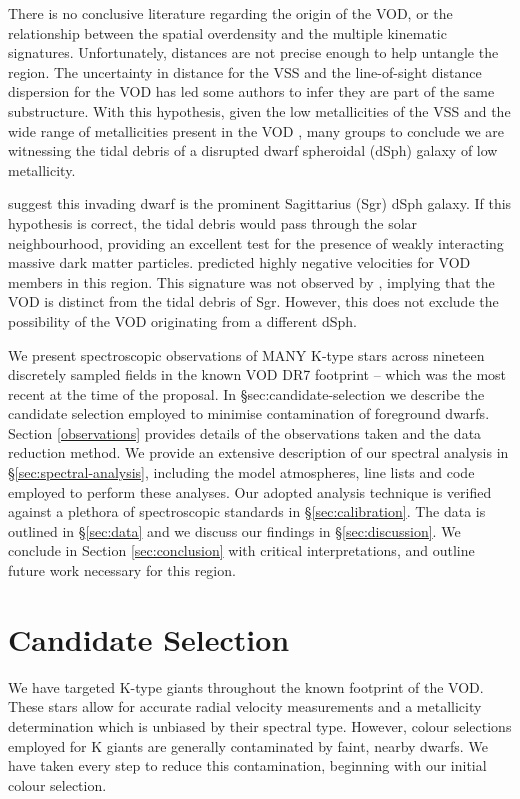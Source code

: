 \documentclass{emulateapj}
\begin{document}
There is no conclusive literature regarding the origin of the VOD, or the relationship between the spatial overdensity and the multiple kinematic signatures. Unfortunately, distances are not precise enough to help untangle the region. The uncertainty in distance for the VSS and the line-of-sight distance dispersion for the VOD has led some authors to infer they are part of the same substructure\citet{Duffau;et-al_2006, Newberg;et-al_2007, Prior;et-al_2009a}. With this hypothesis, given the low metallicities of the VSS \citep{Duffau;et-al_2006, Prior;et-al_2009a} and the wide range of metallicities present in the VOD \citep{Juric;et-al_2008}, many groups \citep{Duffau;et-al_2006, Martinez-Delgado;et-al_2007, Juric;et-al_2008} to conclude we are witnessing the tidal debris of a disrupted dwarf spheroidal (dSph) galaxy of low metallicity.


\citet{Martinez-Delgado;et-al_2007} suggest this invading dwarf is the prominent Sagittarius (Sgr) dSph galaxy. If this hypothesis is correct, the tidal debris would pass through the solar neighbourhood, providing an excellent test for the presence of weakly interacting massive dark matter particles. \citet{Martinez-Delgado;et-al_2007} predicted highly negative velocities for VOD members in this region. This signature was not observed by \citet{Newberg;et-al_2007}, implying that the VOD is distinct from the tidal debris of Sgr. However, this does not exclude the possibility of the VOD originating from a different dSph.

We present spectroscopic observations of MANY K-type stars across nineteen discretely sampled fields in the known VOD DR7 footprint \--- which was the most recent at the time of the proposal. In \S{sec:candidate-selection} we describe the candidate selection employed to minimise contamination of foreground dwarfs. Section \ref{observations} provides details of the observations taken and the data reduction method. We provide an extensive description of our spectral analysis in \S\ref{sec:spectral-analysis}, including the model atmospheres, line lists and code employed to perform these analyses. Our adopted analysis technique is verified against a plethora of spectroscopic standards in \S\ref{sec:calibration}. The data is outlined in \S\ref{sec:data} and we discuss our findings in \S\ref{sec:discussion}. We conclude in Section \ref{sec:conclusion} with critical interpretations, and outline future work necessary for this region.

\section{Candidate Selection}
We have targeted K-type giants throughout the known footprint of the VOD. These stars allow for accurate radial velocity measurements and a metallicity determination which is unbiased by their spectral type. However, colour selections employed for K giants are generally contaminated by faint, nearby dwarfs. We have taken every step to reduce this contamination, beginning with our initial colour selection.
\end{document}

